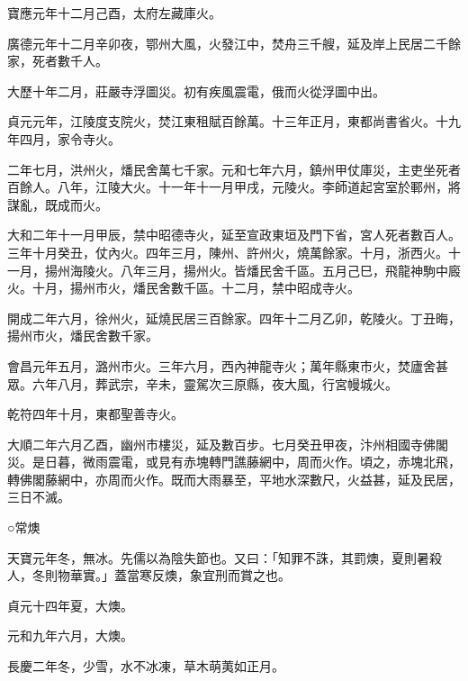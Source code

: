 \begin{pinyinscope}
 寶應元年十二月己酉，太府左藏庫火。



 廣德元年十二月辛卯夜，鄂州大風，火發江中，焚舟三千艘，延及岸上民居二千餘家，死者數千人。



 大歷十年二月，莊嚴寺浮圖災。初有疾風震電，俄而火從浮圖中出。



 貞元元年，江陵度支院火，焚江東租賦百餘萬。十三年正月，東都尚書省火。十九年四月，家令寺火。



 二年七月，洪州火，燔民舍萬七千家。元和七年六月，鎮州甲仗庫災，主吏坐死者百餘人。八年，江陵大火。十一年十一月甲戌，元陵火。李師道起宮室於鄆州，將謀亂，既成而火。



 大和二年十一月甲辰，禁中昭德寺火，延至宣政東垣及門下省，宮人死者數百人。三年十月癸丑，仗內火。四年三月，陳州、許州火，燒萬餘家。十月，浙西火。十一月，揚州海陵火。八年三月，揚州火。皆燔民舍千區。五月己巳，飛龍神駒中廄火。十月，揚州市火，燔民舍數千區。十二月，禁中昭成寺火。



 開成二年六月，徐州火，延燒民居三百餘家。四年十二月乙卯，乾陵火。丁丑晦，揚州市火，燔民舍數千家。



 會昌元年五月，潞州市火。三年六月，西內神龍寺火；萬年縣東市火，焚廬舍甚眾。六年八月，葬武宗，辛未，靈駕次三原縣，夜大風，行宮幔城火。



 乾符四年十月，東都聖善寺火。



 大順二年六月乙酉，幽州市樓災，延及數百步。七月癸丑甲夜，汴州相國寺佛閣災。是日暮，微雨震電，或見有赤塊轉門譙藤網中，周而火作。頃之，赤塊北飛，轉佛閣藤網中，亦周而火作。既而大雨暴至，平地水深數尺，火益甚，延及民居，三日不滅。



 ○常燠



 天寶元年冬，無冰。先儒以為陰失節也。又曰：「知罪不誅，其罰燠，夏則暑殺人，冬則物華實。」蓋當寒反燠，象宜刑而賞之也。



 貞元十四年夏，大燠。



 元和九年六月，大燠。



 長慶二年冬，少雪，水不冰凍，草木萌荑如正月。




\end{pinyinscope}
